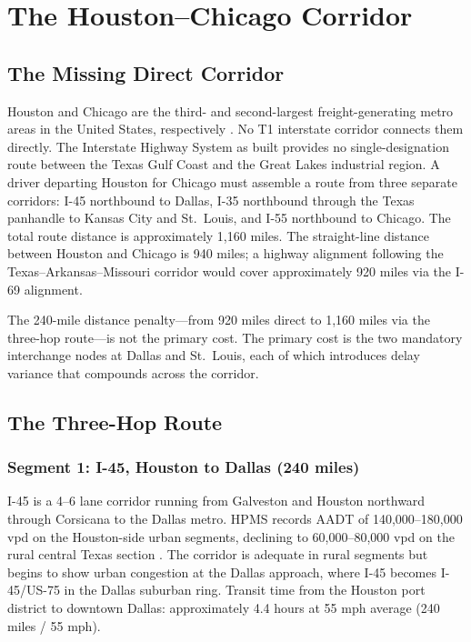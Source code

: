 \section{The Houston--Chicago Corridor}
\label{sec:houtochi}

\subsection{The Missing Direct Corridor}

Houston and Chicago are the third- and second-largest freight-generating metro areas in the United States, respectively \citep{FHWA_freight2023}. No T1 interstate corridor connects them directly. The Interstate Highway System as built provides no single-designation route between the Texas Gulf Coast and the Great Lakes industrial region. A driver departing Houston for Chicago must assemble a route from three separate corridors: I-45 northbound to Dallas, I-35 northbound through the Texas panhandle to Kansas City and St.\ Louis, and I-55 northbound to Chicago. The total route distance is approximately 1,160 miles. The straight-line distance between Houston and Chicago is 940 miles; a highway alignment following the Texas--Arkansas--Missouri corridor would cover approximately 920 miles via the I-69 alignment.

The 240-mile distance penalty---from 920 miles direct to 1,160 miles via the three-hop route---is not the primary cost. The primary cost is the two mandatory interchange nodes at Dallas and St.\ Louis, each of which introduces delay variance that compounds across the corridor.

\subsection{The Three-Hop Route}

\subsubsection{Segment 1: I-45, Houston to Dallas (240 miles)}

I-45 is a 4--6 lane corridor running from Galveston and Houston northward through Corsicana to the Dallas metro. HPMS records AADT of 140,000--180,000 vpd on the Houston-side urban segments, declining to 60,000--80,000 vpd on the rural central Texas section \citep{HPMS2018}. The corridor is adequate in rural segments but begins to show urban congestion at the Dallas approach, where I-45 becomes I-45/US-75 in the Dallas suburban ring. Transit time from the Houston port district to downtown Dallas: approximately 4.4 hours at 55 mph average (240 miles / 55 mph).

